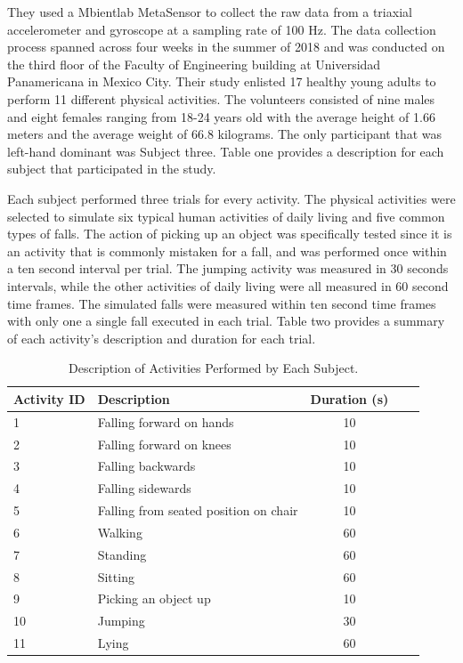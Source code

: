 \documentclass{llncs}
\begin{document}
	They used a Mbientlab MetaSensor to collect the raw data from a triaxial accelerometer and gyroscope at a sampling rate of 100 Hz. The data collection process spanned across four weeks in the summer of 2018 and was conducted on the third floor of the Faculty of Engineering building at Universidad Panamericana in Mexico City.\cite{martinez2019up} Their study enlisted 17 healthy young adults to perform 11 different physical activities. The volunteers consisted of nine males and eight females ranging from 18-24 years old with the average height of 1.66 meters and the average weight of 66.8 kilograms. The only participant that was left-hand dominant was Subject three. Table one provides a description for each subject that participated in the study.
	
	Each subject performed three trials for every activity. The physical activities were selected to simulate six typical human activities of daily living and five common types of falls. The action of picking up an object was specifically tested since it is an activity that is commonly mistaken for a fall, and was performed once within a ten second interval per trial. The jumping activity was measured in 30 seconds intervals, while the other activities of daily living were all measured in 60 second time frames. The simulated falls were measured within ten second time frames with only one a single fall executed in each trial. Table two provides a summary of each activity's description and duration for each trial.

\begin{table}
	\begin{center}
		\caption{Description of Activities Performed by Each Subject.}
		\label{table2}
		\begin{tabular}{llclr}
			\toprule
			Activity ID & Description & Duration (s)\\
			\midrule
			1 &  Falling forward on hands & 10\\
			2 &  Falling forward on knees & 10\\
			3 & Falling backwards & 10\\
			4 & Falling sidewards & 10\\
			5 & Falling from seated position on chair & 10\\
			6 & Walking & 60\\
			7 & Standing & 60\\
			8 & Sitting & 60\\
			9 & Picking an object up & 10\\
			10 & Jumping & 30\\
			11 & Lying & 60\\
			\bottomrule
		\end{tabular}
	\end{center}
\end{table}
\end{document}
